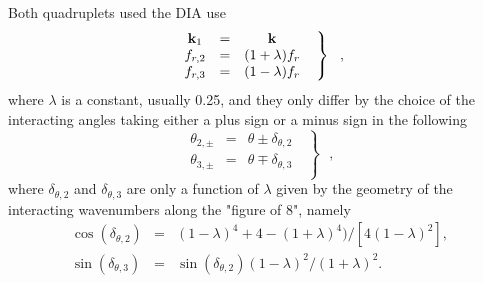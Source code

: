 Both quadruplets used the DIA use 
\begin{equation} \left .
\begin{array}{ccc}
  \mbox{\bf k}_1 & = & \mbox{\bf k}\\
  f_{r,2}  & = & (1+\lambda)f_{r}    \\
  f_{r,3}  & = & (1-\lambda)f_{r} 
\end{array} \:\:\: \right \rbrace \:\:\: , \label{eq:DIAchoice}
\end{equation}
where $\lambda$ is a constant, usually 0.25, and they only differ by the choice of the interacting angles 
taking either a plus sign or a minus sign in the following 
\begin{equation} \left .
\begin{array}{ccc}
  \theta_{2,\pm}  & = & \theta \pm \delta_{\theta,2}   \\
 \theta_{3,\pm}  & = & \theta \mp  \delta_{\theta,3}   \\
 \end{array} \:\:\: \right \rbrace \:\:\: , \label{eq:DIAangles}
\end{equation}
where $\delta_{\theta,2}$ and $\delta_{\theta,3}$ are only a function of $\lambda$ given by the geometry of
the interacting wavenumbers along the "figure of 8", namely  
\begin{eqnarray}
\cos(\delta_{\theta,2})&=&(1-\lambda)^4+4-(1+\lambda)^4)/[4(1-\lambda)^2], \\
\sin(\delta_{\theta,3})&=&\sin(\delta_{\theta,2}) (1-\lambda)^2/(1+\lambda)^2.
\end{eqnarray}

